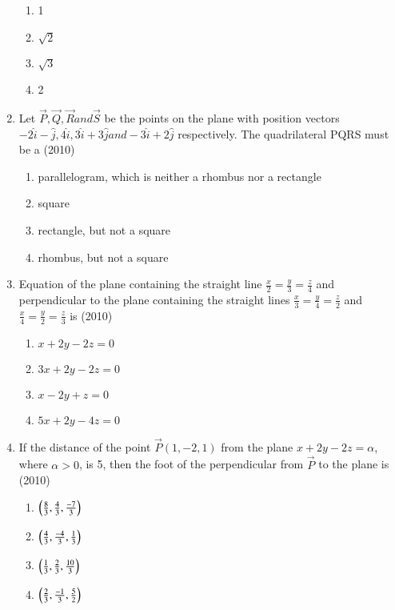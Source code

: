 \documentclass[journal,12pt,onecolumn]{IEEEtran}
\theoremstyle{remark}
\begin{document}
\begin{enumerate}
\begin{multicols}{2}
\begin{enumerate}
    \item 1
    \item $\sqrt{2}$
    \item $\sqrt{3}$
    \item 2
    \end{enumerate}
    \end{multicols}
    \item Let $\vec{P}, \vec{Q}, \vec{R} and \vec{S}$ be the points on the plane with position vectors $-2\hat{i} -\hat{j},4\hat{i},3\hat{i}+3\hat{j} and -3\hat{i}+2\hat{j}$ respectively. The quadrilateral PQRS must be a 
    \hfill{(2010)}
    \begin{enumerate}
    \item parallelogram, which is neither a rhombus nor a rectangle 
    \item square 
    \item rectangle, but not a square
    \item rhombus, but not a square 
    \end{enumerate}
    \item Equation of the plane containing the straight line $\frac{x}{2}=\frac{y}{3}=\frac{z}{4}$ and perpendicular to the plane containing the straight lines $\frac{x}{3}=\frac{y}{4}=\frac{z}{2}$ and $\frac{x}{4}=\frac{y}{2}=\frac{z}{3}$ is 
    \hfill{(2010)}
    \begin{enumerate}
    \item $x+2y-2z=0$
    \item $3x+2y-2z=0$
    \item $x-2y+z=0$
    \item $5x+2y-4z=0$
    \end{enumerate}
    \item If the distance of the point $\vec{P}(1,-2,1)$ from the plane $x+2y-2z=\alpha$, where $\alpha>0$, is 5, then the foot of the perpendicular from $\vec{P}$ to the plane is
    \hfill{(2010)}
    \begin{enumerate}
    \item $\left(\frac{8}{3}, \frac{4}{3}, \frac{-7}{3}\right)$
    \item $\left(\frac{4}{3}, \frac{-4}{3}, \frac{1}{3}\right)$
    \item $\left(\frac{1}{3}, \frac{2}{3}, \frac{10}{3}\right)$
    \item $\left(\frac{2}{3}, \frac{-1}{3}, \frac{5}{2}\right)$
    \end{enumerate}
\end{enumerate}
\end{document}
